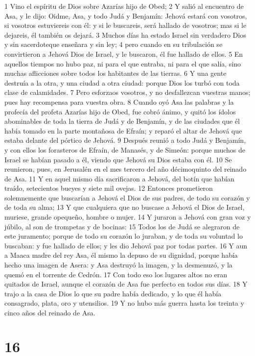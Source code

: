 1 Vino el espíritu de Dios sobre Azarías hijo de Obed;
2 Y salió al encuentro de Asa, y le dijo: Oidme, Asa, y todo Judá y Benjamín: Jehová estará con vosotros, si vosotros estuviereis con él: y si le buscareis, será hallado de vosotros; mas si le dejareis, él también os dejará.
3 Muchos días ha estado Israel sin verdadero Dios y sin sacerdoteque enseñara y sin ley;
4 pero cuando en su tribulación se convirtieron a Jehová Dios de Israel, y le buscaron, él fue hallado de ellos.
5 En aquellos tiempos no hubo paz, ni para el que entraba, ni para el que salía, sino muchas aflicciones sobre todos los habitantes de las tierras.
6 Y una gente destruía a la otra, y una ciudad a otra ciudad: porque Dios los turbó con toda clase de calamidades.
7 Pero esforzaos vosotros, y no desfallezcan vuestras manos; pues hay recompensa para vuestra obra.
8 Cuando oyó Asa las palabras y la profecía del profeta Azarías hijo de Obed, fue cobró ánimo, y quitó los ídolos abominables de toda la tierra de Judá y de Benjamín, y de las ciudades que él había tomado en la parte montañosa de Efraín; y reparó el altar de Jehová que estaba delante del pórtico de Jehová.
9 Después reunió a todo Judá y Benjamín, y con ellos los forasteros de Efraín, de Manasés, y de Simeón: porque muchos de Israel se habían pasado a él, viendo que Jehová su Dios estaba con él.
10 Se reunieron, pues, en Jerusalén  en el mes tercero del año décimoquinto del reinado de Asa.
11 Y en aquel mismo día sacrificaron a Jehová, del botín que habían traído, setecientos bueyes y siete mil ovejas.
12 Entonces prometieron solemnemente que buscarían a Jehová el Dios de sus padres, de todo su corazón y de toda su alma;
13 Y que cualquiera que no buscase a Jehová el Dios de Israel, muriese, grande opequeño, hombre o mujer.
14 Y juraron a Jehová con gran voz y júbilo, al son de trompetas y de bocinas:
15 Todos los de Judá se alegraron de este juramento; porque de todo su corazón lo juraban, y de toda su voluntad lo buscaban: y fue hallado de ellos; y les dio Jehová paz por todas partes.
16 Y aun a Maaca madre del rey Asa, él mismo la depuso de su dignidad, porque había hecho una imagen de Asera: y Asa destruyó la imagen, y la desmenuzó, y la quemó en el torrente de Cedrón.
17 Con todo eso los lugares altos no eran quitados de Israel, aunque el corazón de Asa fue perfecto en todos sus días.
18 Y trajo a la casa de Dios lo que su padre había dedicado, y lo que él había consagrado, plata, oro y utensilios.
19 Y no hubo más guerra hasta los treinta y cinco años del reinado de Asa.

\chapter{16}

